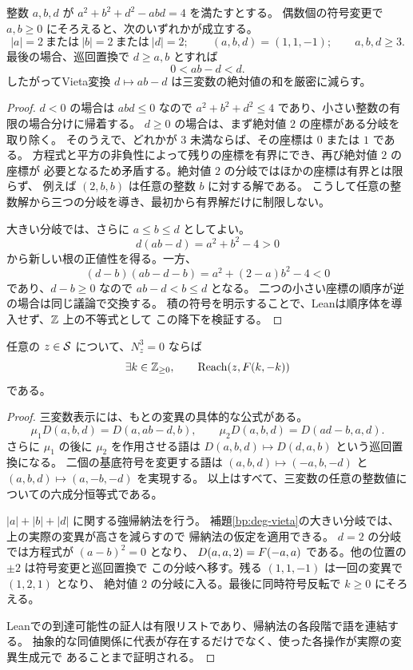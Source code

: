 \begin{lemma}[Cayley立方の整数Vieta降下]
\label{bp:deg-vieta}
\leanok
整数 \(a,b,d\) が \(a^2+b^2+d^2-abd=4\) を満たすとする。
偶数個の符号変更で \(a,b\ge0\) にそろえると、次のいずれかが成立する。
\[
 |a|=2\ \text{または}\ |b|=2\ \text{または}\ |d|=2;
 \qquad (a,b,d)=(1,1,-1);
 \qquad a,b,d\ge3.
\]
最後の場合、巡回置換で \(d\ge a,b\) とすれば
\[
 0<ab-d<d.
\]
したがってVieta変換 \(d\mapsto ab-d\) は三変数の絶対値の和を厳密に減らす。
\end{lemma}
\begin{proof}
\leanok
\(d<0\) の場合は \(abd\le0\) なので
\(a^2+b^2+d^2\le4\) であり、小さい整数の有限の場合分けに帰着する。
\(d\ge0\) の場合は、まず絶対値 \(2\) の座標がある分岐を取り除く。
そのうえで、どれかが \(3\) 未満ならば、その座標は \(0\) または \(1\) である。
方程式と平方の非負性によって残りの座標を有界にでき、再び絶対値 \(2\) の座標が
必要となるため矛盾する。絶対値 \(2\) の分岐ではほかの座標は有界とは限らず、
例えば \((2,b,b)\) は任意の整数 \(b\) に対する解である。
こうして任意の整数解から三つの分岐を導き、最初から有界解だけに制限しない。

大きい分岐では、さらに \(a\le b\le d\) としてよい。
\[
 d(ab-d)=a^2+b^2-4>0
\]
から新しい根の正値性を得る。一方、
\[
 (d-b)(ab-d-b)=a^2+(2-a)b^2-4<0
\]
であり、\(d-b\ge0\) なので \(ab-d<b\le d\) となる。
二つの小さい座標の順序が逆の場合は同じ議論で交換する。
積の符号を明示することで、Leanは順序体を導入せず、\(\mathbb Z\) 上の不等式として
この降下を検証する。
\end{proof}

\begin{theorem}[退化型の標準族への到達]
\label{bp:deg-surjective}
\leanok
任意の \(z\in\mathcal S\) について、\(N_z^3=0\) ならば
\[
 \exists k\in\mathbb Z_{\ge0},\qquad \operatorname{Reach}(z,F(k,-k))
\]
である。
\end{theorem}
\begin{proof}
\leanok
三変数表示には、もとの変異の具体的な公式がある。
\[
 \mu_1D(a,b,d)=D(a,ab-d,b),\qquad
 \mu_2D(a,b,d)=D(ad-b,a,d).
\]
さらに \(\mu_1\) の後に \(\mu_2\) を作用させる語は
\(D(a,b,d)\mapsto D(d,a,b)\) という巡回置換になる。
二個の基底符号を変更する語は
\((a,b,d)\mapsto(-a,b,-d)\) と
\((a,b,d)\mapsto(a,-b,-d)\) を実現する。
以上はすべて、三変数の任意の整数値についての六成分恒等式である。

\(|a|+|b|+|d|\) に関する強帰納法を行う。
補題\ref{bp:deg-vieta}の大きい分岐では、上の実際の変異が高さを減らすので
帰納法の仮定を適用できる。
\(d=2\) の分岐では方程式が \((a-b)^2=0\) となり、
\(D(a,a,2)=F(-a,a)\) である。他の位置の \(\pm2\) は符号変更と巡回置換で
この分岐へ移す。残る \((1,1,-1)\) は一回の変異で \((1,2,1)\) となり、
絶対値 \(2\) の分岐に入る。最後に同時符号反転で \(k\ge0\) にそろえる。

Leanでの到達可能性の証人は有限リストであり、帰納法の各段階で語を連結する。
抽象的な同値関係に代表が存在するだけでなく、使った各操作が実際の変異生成元で
あることまで証明される。
\end{proof}

